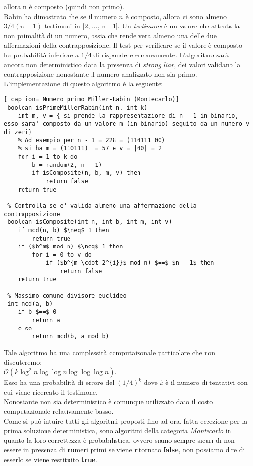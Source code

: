 \documentclass[../cheatSheetAlgoritmi.tex]{subfiles}
\begin{document}
allora n è composto (quindi non primo). \\
Rabin ha dimostrato che se il numero $n$ è composto, allora ci sono almeno $3/4 (n - 1)$ testimoni in [2, ..., n - 1]. Un \emph{testimone} è un valore che attesta la non primalità di un numero, ossia che rende vera almeno una delle due affermazioni della contrapposizione. Il test per verificare se il valore è composto ha probabilità inferiore a $1/4$ di rispondere erroneamente. L'algoritmo sarà ancora non deterministico data la presenza di \emph{strong liar}, dei valori validano la contrapposizione nonostante il numero analizzato non sia primo. \\
L'implementazione di questo algoritmo è la seguente: 
 \begin{lstlisting}[ caption= Numero primo Miller-Rabin (Montecarlo)]
 boolean isPrimeMillerRabin(int n, int k)
 	int m, v = { si prende la rappresentazione di n - 1 in binario, esso sara' composto da un valore m (in binario) seguito da un numero v di zeri}
 	% Ad esempio per n - 1 = 228 = (110111 00) 
 	% si ha m = (110111)  = 57 e v = |00| = 2
 	for i = 1 to k do
 		b = random(2, n - 1)
 		if isComposite(n, b, m, v) then
 			return false
 	return true
 
 % Controlla se e' valida almeno una affermazione della contrapposizione
 boolean isComposite(int n, int b, int m, int v)
 	if mcd(n, b) $\neq$ 1 then
 		return true
 	if ($b^m$ mod n) $\neq$ 1 then
 		for i = 0 to v do
 			if ($b^{m \cdot 2^{i}}$ mod n) $==$ $n - 1$ then	
 				return false
 	return true
 	
 % Massimo comune divisore euclideo
 int mcd(a, b)
    if b $==$ 0
        return a
    else
        return mcd(b, a mod b)
\end{lstlisting}
Tale algoritmo ha una complessità computaizonale particolare che non discuteremo: \\
 $\mathcal{O}(k \log^2 n \log \log n \log \log \log n)$. \\
 Esso ha una probabilità di errore del $(1/4)^k$ dove $k$ è il numero di tentativi con cui viene ricercato il testimone. \\
 Nonostante non sia deterministico è comunque utilizzato dato il costo computazionale relativamente basso. \\
Come si può intuire tutti gli algoritmi proposti fino ad ora, fatta eccezione per la prima soluzione deterministica, sono algoritmi della categoria \emph{Montecarlo} in quanto la loro correttezza è probabilistica, ovvero siamo sempre sicuri di non essere in presenza di numeri primi se viene ritornato \textbf{false}, non possiamo dire di esserlo se viene restituito \textbf{true}.
\end{document}
